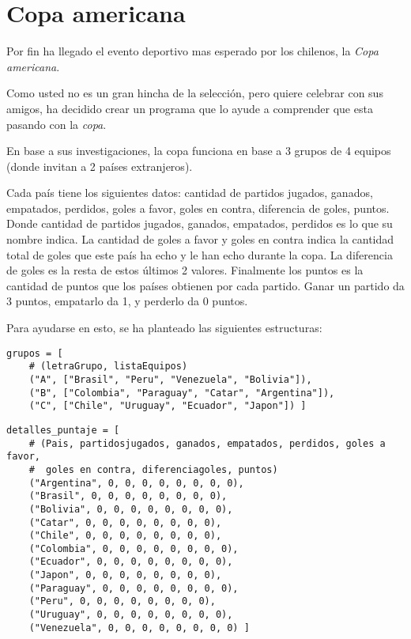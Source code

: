 \section{Copa americana}

Por fin ha llegado el evento deportivo mas esperado por los chilenos, la \textit{Copa americana}.

Como usted no es un gran hincha de la selección, pero quiere celebrar con sus amigos, ha decidido crear un programa que lo ayude a comprender que esta pasando con la \textit{copa}.

En base a sus investigaciones, la copa funciona en base a 3 grupos de 4 equipos (donde invitan a 2 países extranjeros).

Cada país tiene los siguientes datos: cantidad de partidos jugados, ganados, empatados, perdidos, goles a favor, goles en contra, diferencia de goles, puntos. Donde cantidad de partidos jugados, ganados, empatados, perdidos es lo que su nombre indica. La cantidad de goles a favor y goles en contra indica la cantidad total de goles que este país ha echo y le han echo durante la copa. La diferencia de goles es la resta de estos últimos 2 valores. Finalmente los puntos es la cantidad de puntos que los países obtienen por cada partido. Ganar un partido da 3 puntos, empatarlo da 1, y perderlo da 0 puntos.

Para ayudarse en esto, se ha planteado las siguientes estructuras:

\begin{lstlisting}[style=consola]
grupos = [
    # (letraGrupo, listaEquipos)
    ("A", ["Brasil", "Peru", "Venezuela", "Bolivia"]),
    ("B", ["Colombia", "Paraguay", "Catar", "Argentina"]),
    ("C", ["Chile", "Uruguay", "Ecuador", "Japon"]) ]
\end{lstlisting}

\begin{lstlisting}[style=consola]
detalles_puntaje = [
    # (Pais, partidosjugados, ganados, empatados, perdidos, goles a favor, 
    #  goles en contra, diferenciagoles, puntos)
    ("Argentina", 0, 0, 0, 0, 0, 0, 0, 0),
    ("Brasil", 0, 0, 0, 0, 0, 0, 0, 0),
    ("Bolivia", 0, 0, 0, 0, 0, 0, 0, 0),
    ("Catar", 0, 0, 0, 0, 0, 0, 0, 0),
    ("Chile", 0, 0, 0, 0, 0, 0, 0, 0),
    ("Colombia", 0, 0, 0, 0, 0, 0, 0, 0),
    ("Ecuador", 0, 0, 0, 0, 0, 0, 0, 0),
    ("Japon", 0, 0, 0, 0, 0, 0, 0, 0),
    ("Paraguay", 0, 0, 0, 0, 0, 0, 0, 0),
    ("Peru", 0, 0, 0, 0, 0, 0, 0, 0),
    ("Uruguay", 0, 0, 0, 0, 0, 0, 0, 0),
    ("Venezuela", 0, 0, 0, 0, 0, 0, 0, 0) ]
\end{lstlisting}

